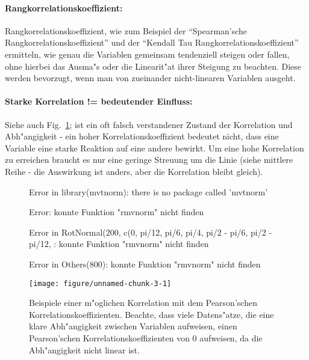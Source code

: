 \documentclass[a4paper,twoside]{tufte-book}\usepackage[]{graphicx}\usepackage[]{color}
\makeatletter
\def\maxwidth{ %
  \ifdim\Gin@nat@width>\linewidth
    \linewidth
  \else
    \Gin@nat@width
  \fi
}
\makeatother
\begin{document}
\paragraph{Rangkorrelationskoeffizient:} Rangkorrelationskoeffizient, wie zum Beispiel der ``Spearman'sche Rangkorrelationskoeffizient'' und der ``Kendall Tau Rangkorrelationskoeffizient'' ermitteln, wie genau die Variablen gemeinsam tendenziell steigen oder fallen, ohne hierbei das Ausma"s oder die Linearit"at ihrer Steigung zu beachten. Diese werden bevorzugt, wenn man von zueinander nicht-linearen Variablen ausgeht. 

\paragraph{Starke Korrelation != bedeutender Einfluss:} Siehe auch Fig.~\ref{fig: correlation}; ist ein oft falsch verstandener Zustand der Korrelation und Abh"angigkeit - ein hoher Korrelationskoeffizient bedeutet nicht, dass eine Variable eine starke Reaktion auf eine andere bewirkt. Um eine hohe Korrelation zu erreichen braucht es nur eine geringe Streuung um die Linie (siehe mittlere Reihe - die Auswirkung ist anders, aber die Korrelation bleibt gleich). 


\begin{figure}[htbp]
\begin{center}
\begin{Schunk}
\begin{Soutput}
Error in library(mvtnorm): there is no package called 'mvtnorm'
\end{Soutput}
\begin{Soutput}
Error: konnte Funktion "rmvnorm" nicht finden
\end{Soutput}
\begin{Soutput}
Error in RotNormal(200, c(0, pi/12, pi/6, pi/4, pi/2 - pi/6, pi/2 - pi/12, : konnte Funktion "rmvnorm" nicht finden
\end{Soutput}
\begin{Soutput}
Error in Others(800): konnte Funktion "rmvnorm" nicht finden
\end{Soutput}

\texttt{[image: figure/unnamed-chunk-3-1]} \end{Schunk}
\caption{Beispiele einer m"oglichen Korrelation mit dem Pearson'schen Korrelationskoeffizienten. Beachte, dass viele Datens"atze, die eine klare Abh"angigkeit zwischen Variablen aufweisen, einen Pearson'schen Korrelationskoeffizienten von 0 aufweisen, da die Abh"angigkeit nicht linear ist.}
\label{fig: correlation}
\end{center}
\end{figure}
\end{document}

